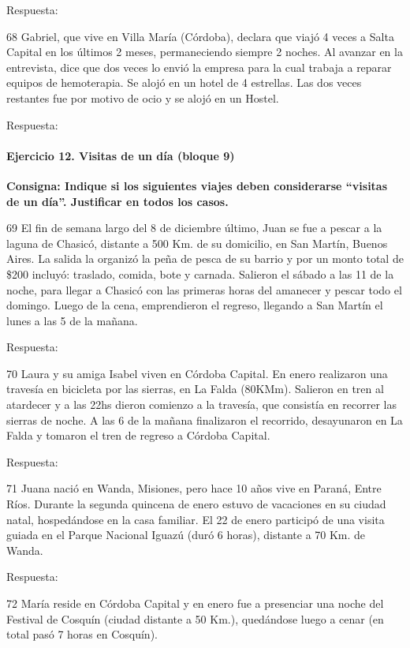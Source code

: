 \documentclass[
  openany]{book}
\begin{document}
Respuesta:

68 Gabriel, que vive en Villa María (Córdoba), declara que viajó 4 veces a Salta Capital en los últimos 2 meses, permaneciendo siempre 2 noches. Al avanzar en la entrevista, dice que dos veces lo envió la empresa para la cual trabaja a reparar equipos de hemoterapia. Se alojó en un hotel de 4 estrellas. Las dos veces restantes fue por motivo de ocio y se alojó en un Hostel.

Respuesta:

\hypertarget{ejercicio-12.-visitas-de-un-duxeda-bloque-9}{%
\paragraph{Ejercicio 12. Visitas de un día (bloque 9)}\label{ejercicio-12.-visitas-de-un-duxeda-bloque-9}}

\textbf{Consigna: Indique si los siguientes viajes deben considerarse ``visitas de un día''. Justificar en todos los casos.}

69 El fin de semana largo del 8 de diciembre último, Juan se fue a pescar a la laguna de Chasicó, distante a 500 Km. de su domicilio, en San Martín, Buenos Aires. La salida la organizó la peña de pesca de su barrio y por un monto total de \$200 incluyó: traslado, comida, bote y carnada. Salieron el sábado a las 11 de la noche, para llegar a Chasicó con las primeras horas del amanecer y pescar todo el domingo. Luego de la cena, emprendieron el regreso, llegando a San Martín el lunes a las 5 de la mañana.

Respuesta:

70 Laura y su amiga Isabel viven en Córdoba Capital. En enero realizaron una travesía en bicicleta por las sierras, en La Falda (80KMm). Salieron en tren al atardecer y a las 22hs dieron comienzo a la travesía, que consistía en recorrer las sierras de noche. A las 6 de la mañana finalizaron el recorrido, desayunaron en La Falda y tomaron el tren de regreso a Córdoba Capital.

Respuesta:

71 Juana nació en Wanda, Misiones, pero hace 10 años vive en Paraná, Entre Ríos. Durante la segunda quincena de enero estuvo de vacaciones en su ciudad natal, hospedándose en la casa familiar. El 22 de enero participó de una visita guiada en el Parque Nacional Iguazú (duró 6 horas), distante a 70 Km. de Wanda.

Respuesta:

72 María reside en Córdoba Capital y en enero fue a presenciar una noche del Festival de Cosquín (ciudad distante a 50 Km.), quedándose luego a cenar (en total pasó 7 horas en Cosquín).
\end{document}

